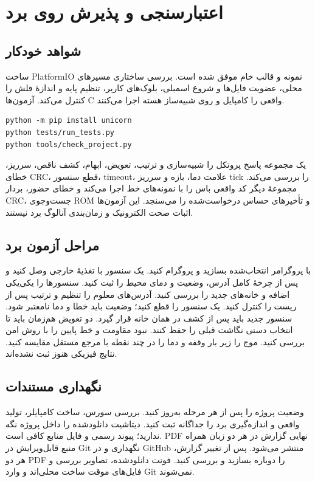 \section{اعتبارسنجی و پذیرش روی برد}
\subsection{شواهد خودکار}
ساخت PlatformIO نمونه و قالب خام موفق شده است. بررسی ساختاری مسیرهای محلی،
عضویت فایل‌ها و شروع اسمبلی، بلوک‌های کاربر، تنظیم پایه و اندازهٔ فلش را
کنترل می‌کند. آزمون‌ها C واقعی را کامپایل و روی شبیه‌ساز هسته اجرا می‌کنند.
\begin{LTR}
\begin{lstlisting}[language={}]
python -m pip install unicorn
python tests/run_tests.py
python tools/check_project.py
\end{lstlisting}
\end{LTR}
یک مجموعه پاسخ پروتکل را شبیه‌سازی و ترتیب، تعویض، ابهام، کشف ناقص، سرریز،
خطای CRC، قطع سنسور، timeout، علامت دما، بازه و سرریز tick را بررسی می‌کند.
مجموعهٔ دیگر کد واقعی باس را با نمونه‌های خط اجرا می‌کند و خطای حضور، بردار
CRC، جست‌وجوی ROM و تأخیرهای حساس درخواست‌شده را می‌سنجد. این آزمون‌ها اثبات
صحت الکترونیک و زمان‌بندی آنالوگ برد نیستند.

\subsection{مراحل آزمون برد}
با پروگرامر انتخاب‌شده بسازید و پروگرام کنید. یک سنسور با تغذیهٔ خارجی وصل
کنید و پس از چرخهٔ کامل آدرس، وضعیت و دمای محیط را ثبت کنید. سنسورها را
یکی‌یکی اضافه و خانه‌های جدید را بررسی کنید. آدرس‌های معلوم را تنظیم و ترتیب
پس از ریست را کنترل کنید. یک سنسور را قطع کنید؛ وضعیت باید خطا و دما نامعتبر
شود. سنسور جدید باید پس از کشف در همان خانه قرار گیرد. دو تعویض هم‌زمان باید
تا انتخاب دستی نگاشت قبلی را حفظ کنند. نبود مقاومت و خط پایین را با روش امن
بررسی کنید. موج را زیر بار وقفه و دما را در چند نقطه با مرجع مستقل مقایسه کنید.
نتایج فیزیکی هنوز ثبت نشده‌اند.

\subsection{نگهداری مستندات}
وضعیت پروژه را پس از هر مرحله به‌روز کنید. بررسی سورس، ساخت کامپایلر، تولید
واقعی و اندازه‌گیری برد را جداگانه ثبت کنید. دیتاشیت دانلودشده را داخل پروژه
نگه ندارید؛ پیوند رسمی و فایل منابع کافی است. PDF نهایی گزارش در هر دو زبان
همراه منبع قابل‌ویرایش در Git نگهداری و در GitHub منتشر می‌شود. پس از تغییر
گزارش، هر دو PDF را دوباره بسازید و بررسی کنید. فونت دانلودشده، تصاویر بررسی
و فایل‌های موقت ساخت محلی‌اند و وارد Git نمی‌شوند.

